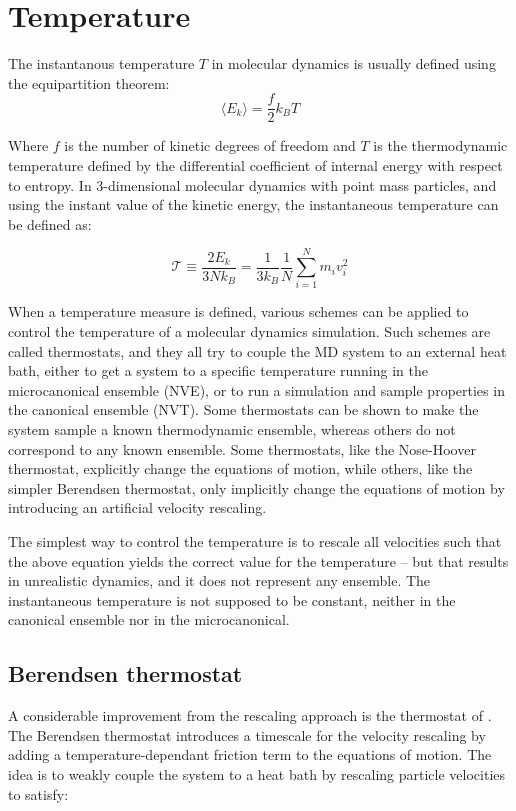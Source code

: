 \section{Temperature}
The instantanous temperature $T$ in molecular dynamics is usually defined using the equipartition theorem:
\begin{equation}
	\langle E_k \rangle = \frac{f}{2}k_B T
\end{equation}

Where $f$ is the number of kinetic degrees of freedom and $T$ is the thermodynamic temperature defined by the differential coefficient of internal energy with respect to entropy. In 3-dimensional molecular dynamics with point mass particles, and using the instant value of the kinetic energy, the instantaneous temperature can be defined as:

\begin{equation}
	\mathcal{T} \equiv \frac{2E_k}{3 Nk_B} = \frac{1}{3 k_B} \frac{1}{N}\sum_{i=1}^{N} m_iv_i^2
\end{equation}

When a temperature measure is defined, various schemes can be applied to control the temperature of a molecular dynamics simulation. Such schemes are called thermostats, and they all try to couple the MD system to an external heat bath, either to get a system to a specific temperature running in the microcanonical ensemble (NVE), or to run a simulation and sample properties in the canonical ensemble (NVT). Some thermostats can be shown to make the system sample a known thermodynamic ensemble, whereas others do not correspond to any known ensemble. Some thermostats, like the Nose-Hoover thermostat, explicitly change the equations of motion, while others, like the simpler Berendsen thermostat, only implicitly change the equations of motion by introducing an artificial velocity rescaling. 

The simplest way to control the temperature is to rescale all velocities such that the above equation yields the correct value for the temperature -- but that results in unrealistic dynamics, and it does not represent any ensemble. The instantaneous temperature is not supposed to be constant, neither in the canonical ensemble nor in the microcanonical. 

\subsection{Berendsen thermostat}
A considerable improvement from the rescaling approach is the thermostat of \citet{Berendsen1984}. The Berendsen thermostat introduces a timescale for the velocity rescaling by adding a temperature-dependant friction term to the equations of motion. The idea is to weakly couple the system to a heat bath by rescaling particle velocities to satisfy:

